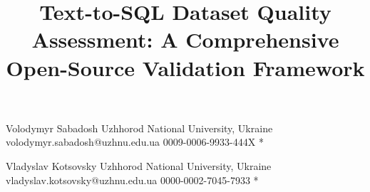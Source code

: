 \documentclass[]{einformatica}
\begin{document}
\nocite{furst2024datamodel,shi2025survey,gao2023text2sql,spiderLeaderboard,shkapenyuk2025metadata,birdLeaderboard,yu2018spider,snowflakeCopilotInline,databricksGenie,fabricCopilotSql,chang2023drspider,yao2025arctic,zhong2017seq2sql,li2023bird,gretelSynthDataset,li2025omnisql,liu2025nl2sqlbugs,mitsopoulou2025analysis,pandey2024validation,pythonDocs311,duckdbDocs,sqlalchemyDocs20,sqlglotRepo,dependencyInjectorDocs,pyyaml,karwin2010sqlantipatterns,date2012sqlrelational,iso9075_2_2016,sqliteBareColumns,postgresGroupBy,mysqlGroupByHandling,molinaro2020sqlcookbook,ramakrishnan2003dbms,sqliteForeignKeys,openaiModelsDocs,geminiApiDocs}

\title{Text-to-SQL Dataset Quality Assessment: A Comprehensive Open-Source Validation Framework}



\EIauthorI
   {Volodymyr}
   {Sabadosh}
   {Uzhhorod National University, Ukraine}
   {volodymyr.sabadosh@uzhnu.edu.ua}
   {0009-0006-9933-444X}
   {*} %

\EIauthorII
   {Vladyslav}
   {Kotsovsky}
   {Uzhhorod National University, Ukraine}
   {vladyslav.kotsovsky@uzhnu.edu.ua}
   {0000-0002-7045-7933}
   {*} %
 
\end{document}
